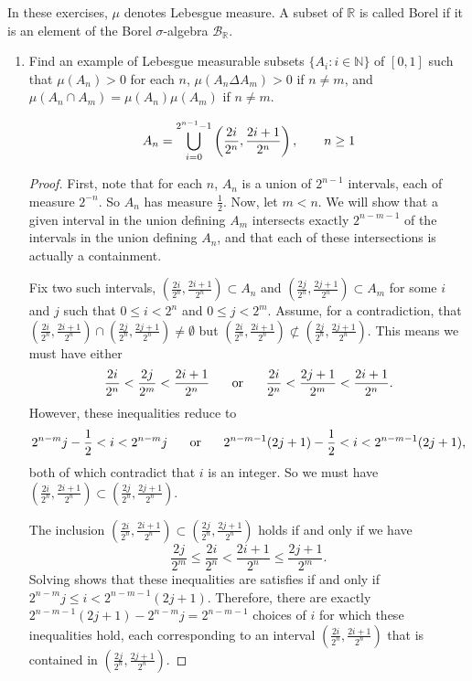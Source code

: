 \documentclass[10pt]{article}
\newcommand{\R}{\mathbb{R}}
\newcommand{\N}{\mathbb{N}}
\newcommand{\B}{\mathcal{B}}
\newcommand{\sd}{\Delta}
\begin{document}
\noindent In these exercises, $\mu$ denotes Lebesgue measure.  A subset of $\R$ is called Borel if it is an element of the Borel $\sigma$-algebra $\B_\R$.

\begin{enumerate}

\item Find an example of Lebesgue measurable subsets $\{A_i : i \in \N\}$ of $[0,1]$ such that $\mu(A_n) > 0$ for each $n$, $\mu(A_n \sd A_m) > 0$ if $n \neq m$, and $\mu(A_n \cap A_m) = \mu(A_n)\mu(A_m)$ if $n \neq m$.

$$
A_n = \bigcup_{i=0}^{2^{n-1}-1} \left(\frac{2i}{2^n}, \frac{2i + 1}{2^n}\right), \hspace{.7cm} n \geq 1
$$

\begin{proof}
First, note that for each $n$, $A_n$ is a union of $2^{n-1}$ intervals, each of measure $2^{-n}$.  So $A_n$ has measure $\frac12$.  Now, let $m < n$.  We will show that a given interval in the union defining $A_m$ intersects exactly $2^{n-m-1}$ of the intervals in the union defining $A_n$, and that each of these intersections is actually a containment.

Fix two such intervals, $\left(\frac{2i}{2^n}, \frac{2i + 1}{2^n}\right) \subset A_n$ and $\left(\frac{2j}{2^n}, \frac{2j + 1}{2^n}\right) \subset A_m$ for some $i$ and $j$ such that $0 \leq i < 2^n$ and $0 \leq j < 2^m$.  Assume, for a contradiction, that $\left(\frac{2i}{2^n}, \frac{2i + 1}{2^n}\right) \cap \left(\frac{2j}{2^n}, \frac{2j + 1}{2^n}\right) \neq \emptyset$ but $\left(\frac{2i}{2^n}, \frac{2i + 1}{2^n}\right) \not \subset \left(\frac{2j}{2^n}, \frac{2j + 1}{2^n}\right)$.  This means we must have either
$$
\frac{2i}{2^n} < \frac{2j}{2^m} < \frac{2i+1}{2^n}
\hspace{.5cm} \text{ or } \hspace{.5cm}
\frac{2i}{2^n} < \frac{2j+1}{2^m} < \frac{2i+1}{2^n}.
$$
However, these inequalities reduce to
$$
2^{n-m}j - \frac12 < i < 2^{n-m}j
\hspace{.5cm} \text{ or } \hspace{.5cm}
2^{n-m-1}(2j+1) - \frac12 < i < 2^{n-m-1}(2j+1),
$$
both of which contradict that $i$ is an integer.  So we must have $\left(\frac{2i}{2^n}, \frac{2i + 1}{2^n}\right) \subset \left(\frac{2j}{2^n}, \frac{2j + 1}{2^n}\right)$.

The inclusion $\left(\frac{2i}{2^n}, \frac{2i + 1}{2^n}\right) \subset \left(\frac{2j}{2^n}, \frac{2j + 1}{2^n}\right)$ holds if and only if we have
$$
\frac{2j}{2^m} \leq \frac{2i}{2^n} < \frac{2i + 1}{2^n} \leq \frac{2j+1}{2^m}.
$$
Solving shows that these inequalities are satisfies if and only if $2^{n-m}j \leq i < 2^{n-m-1}(2j+1)$.  Therefore, there are exactly $2^{n-m-1}(2j+1) - 2^{n-m}j = 2^{n-m-1}$ choices of $i$ for which these inequalities hold, each corresponding to an interval $\left(\frac{2i}{2^n}, \frac{2i + 1}{2^n}\right)$ that is contained in $\left(\frac{2j}{2^n}, \frac{2j + 1}{2^n}\right)$.


\end{proof}
\end{enumerate}
\end{document}
